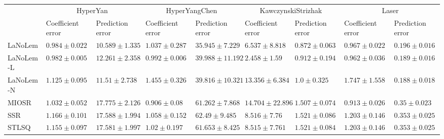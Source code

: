 \begin{table*}
{\begin{tabular}{lllllllll}
 & \multicolumn{2}{c}{HyperYan} & \multicolumn{2}{c}{HyperYangChen} & \multicolumn{2}{c}{KawczynskiStrizhak} & \multicolumn{2}{c}{Laser} \\
 & Coefficient error & Prediction error & Coefficient error & Prediction error & Coefficient error & Prediction error & Coefficient error & Prediction error \\
\midrule
LaNoLem & $0.984\pm 0.022$ & $\mathbf{10.589}\pm 1.335$ & $1.037\pm 0.287$ & $\mathbf{35.945}\pm 7.229$ & $6.537\pm 8.818$ & $\mathbf{0.872}\pm 0.063$ & $0.967\pm 0.022$ & $0.196\pm 0.016$ \\
LaNoLem-L & $\mathbf{0.982}\pm 0.005$ & $12.261\pm 2.358$ & $0.992\pm 0.006$ & $39.988\pm 11.192$ & $\mathbf{2.458}\pm 1.59$ & $0.912\pm 0.194$ & $0.962\pm 0.036$ & $0.189\pm 0.016$ \\
LaNoLem-N & $1.125\pm 0.095$ & $11.51\pm 2.738$ & $1.455\pm 0.326$ & $39.816\pm 10.321$ & $13.356\pm 6.384$ & $1.0\pm 0.325$ & $1.747\pm 1.558$ & $\mathbf{0.188}\pm 0.018$ \\
MIOSR & $1.032\pm 0.052$ & $17.775\pm 2.126$ & $\mathbf{0.906}\pm 0.08$ & $61.262\pm 7.868$ & $14.704\pm 22.896$ & $1.507\pm 0.074$ & $\mathbf{0.913}\pm 0.026$ & $0.35\pm 0.023$ \\
SSR & $1.166\pm 0.101$ & $17.588\pm 1.994$ & $1.058\pm 0.152$ & $62.49\pm 9.485$ & $8.516\pm 7.76$ & $1.521\pm 0.086$ & $1.203\pm 0.146$ & $0.353\pm 0.025$ \\
STLSQ & $1.155\pm 0.097$ & $17.581\pm 1.997$ & $1.02\pm 0.197$ & $61.653\pm 8.425$ & $8.515\pm 7.761$ & $1.521\pm 0.084$ & $1.203\pm 0.146$ & $0.353\pm 0.025$ \\

\midrule


\end{tabular}}
\end{table*}
